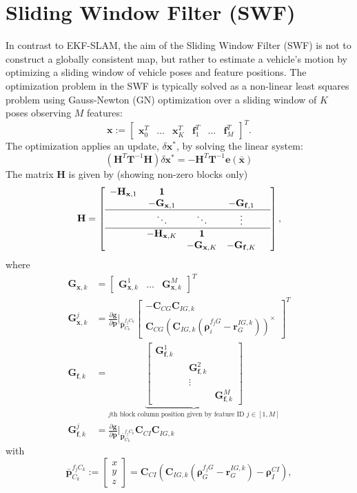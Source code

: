 \documentclass[letterpaper, 10 pt, conference]{ieeeconf}  %
\def\Vec#1{\mathbf{#1}}
\newcommand{\bbm}{\begin{bmatrix}}
\newcommand{\ebm}{\end{bmatrix}}
\newcommand{\pd}[2]{\frac{\partial #1}{\partial #2}}
\begin{document}
\section{Sliding Window Filter (SWF)} \label{sec:SWF}
In contrast to EKF-SLAM, the aim of the Sliding Window Filter (SWF) is not to construct a globally consistent map, but rather to estimate a vehicle's motion by optimizing a sliding window of vehicle poses and feature positions.
The optimization problem in the SWF is typically solved as a non-linear least squares problem using Gauss-Newton (GN) optimization over a sliding window of $K$ poses observing $M$ features: 
\begin{equation}
\Vec{x} := \bbm \Vec x_0^T & \hdots & \Vec x_K^T & \Vec f_1^T & \hdots & \Vec f_M^T\ebm ^T.
\end{equation}
The optimization applies an update, $ \delta \Vec{x}^*$, by solving the linear system:
\begin{equation}
(\Vec H^T \Vec T ^{-1} \Vec H ) \delta \Vec{x}^*  = - \Vec{H}^T\Vec{T}^{-1}\Vec{e}(\bar{\Vec{x}})
\end{equation}
The matrix $\Vec{H}$ is given by (showing non-zero blocks only)
\begin{equation}
\mathbf{H} = \left[\begin{array}{cccccc}
 -\Vec H_{\Vec x, 1} & \Vec 1 & & &   \\ 
 & -\Vec G_{\Vec x, 1} &  &   -\Vec G_{\Vec f, 1} \\ \hline
 & \ddots & \ddots & \vdots  \\  \hline
 & -\Vec H_{\Vec x, K} & \Vec 1 & \\ 
 & & -\Vec G_{\Vec x, K} &  -\Vec G_{\Vec f, K}   \\  
\end{array}\right], 
\end{equation}
where
\begin{align}
\Vec G_{\Vec x, k} &= \bbm \Vec G_{\Vec x, k}^1 & \hdots & \Vec G_{\Vec x, k}^M \ebm ^T
\\[0.5em]
\Vec G_{\Vec{x}, k}^j &= \pd{\Vec g}{ \Vec p}\Bigr|_{\bar{\Vec p}_{C_k}^{f_j C_k}}
    \bbm -\Vec C_{CG} \Vec C_{IG,k} \\[0.5em] \Vec C_{CG} (\Vec C_{IG,k} (\boldsymbol{\rho}_i^{f_j G} - \Vec r_G^{IG,k} ) )^\times  \ebm ^T
\\[0.5em]
\Vec G_{\Vec f, k} &= \underbrace{\bbm \Vec G_{\Vec f, k}^1 & & \\ & & \Vec G_{\Vec f, k}^2 & \\ & & \vdots &  \\ & & & \Vec G_{\Vec f, k}^M \ebm}_{\text{$j$th block column position given by feature ID $j\in[1,M]$}} \\[0.5em]
\Vec G_{\Vec f, k}^j &= \pd{\Vec g}{ \Vec p}\Bigr|_{\bar{\Vec p}_{C_k}^{f_j C_k}} \Vec C_{CI} \Vec C_{IG,k}
\end{align}
with
\begin{equation}
\bar{\Vec p}_{C_k}^{f_j C_k} := \bbm x \\ y \\ z \ebm = \Vec C_{CI} \left( \Vec C_{IG,k} (\boldsymbol{\rho}_G^{f_j G} - \Vec r_G^{IG,k} )   - \boldsymbol \rho_I^{CI} \right),
\end{equation}
\end{document}

